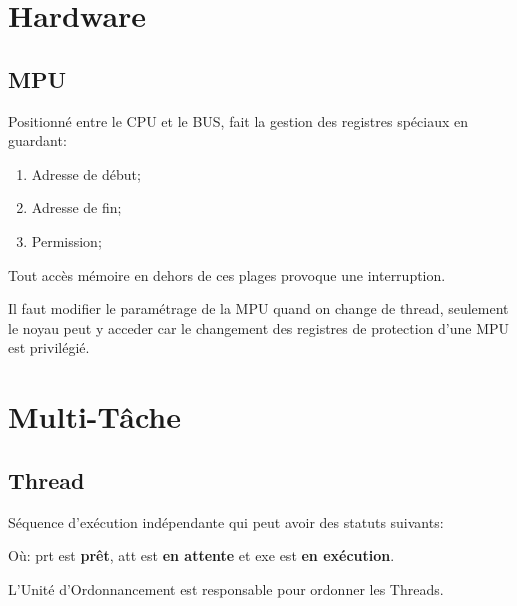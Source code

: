 \documentclass{article}
\begin{document}
\section{Hardware}
\subsection{MPU}
\begin{definition}
    Positionné entre le CPU et le BUS, fait la gestion des registres spéciaux en guardant:
    \begin{enumerate}[noitemsep]
        \item Adresse de début;
        \item Adresse de fin;
        \item Permission;
    \end{enumerate}
    Tout accès mémoire en dehors de ces plages provoque une interruption.

    \begin{remark}
        Il faut modifier le paramétrage de la MPU quand on change de thread, seulement le noyau peut y acceder car le changement des registres de protection d'une MPU est privilégié.
    \end{remark}
\end{definition}



\section{Multi-Tâche}

\subsection{Thread}
\begin{definition}
    Séquence d'exécution indépendante qui peut avoir des statuts suivants:
    \begin{figure}[H]
        \centering
    \end{figure}
    Où: prt est \textbf{prêt}, att est \textbf{en attente} et exe est \textbf{en exécution}.
    
    \begin{remark}
        L'Unité d'Ordonnancement est responsable pour ordonner les Threads.
    \end{remark}
\end{definition}
\end{document}
